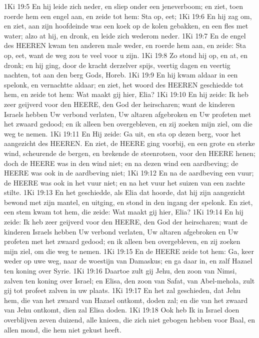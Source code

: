 1Ki 19:5  En hij leide zich neder, en sliep onder een jeneverboom; en ziet, toen roerde hem een engel aan, en zeide tot hem: Sta op, eet;
1Ki 19:6  En hij zag om, en ziet, aan zijn hoofdeinde was een koek op de kolen gebakken, en een fles met water; alzo at hij, en dronk, en leide zich wederom neder.
1Ki 19:7  En de engel des HEEREN kwam ten anderen male weder, en roerde hem aan, en zeide: Sta op, eet, want de weg zou te veel voor u zijn.
1Ki 19:8  Zo stond hij op, en at, en dronk; en hij ging, door de kracht derzelver spijs, veertig dagen en veertig nachten, tot aan den berg Gods, Horeb.
1Ki 19:9  En hij kwam aldaar in een spelonk, en vernachtte aldaar; en ziet, het woord des HEEREN geschiedde tot hem, en zeide tot hem: Wat maakt gij hier, Elia?
1Ki 19:10  En hij zeide: Ik heb zeer geijverd voor den HEERE, den God der heirscharen; want de kinderen Israels hebben Uw verbond verlaten, Uw altaren afgebroken en Uw profeten met het zwaard gedood; en ik alleen ben overgebleven, en zij zoeken mijn ziel, om die weg te nemen.
1Ki 19:11  En Hij zeide: Ga uit, en sta op dezen berg, voor het aangezicht des HEEREN. En ziet, de HEERE ging voorbij, en een grote en sterke wind, scheurende de bergen, en brekende de steenrotsen, voor den HEERE henen; doch de HEERE was in den wind niet; en na dezen wind een aardbeving; de HEERE was ook in de aardbeving niet;
1Ki 19:12  En na de aardbeving een vuur; de HEERE was ook in het vuur niet; en na het vuur het suizen van een zachte stilte.
1Ki 19:13  En het geschiedde, als Elia dat hoorde, dat hij zijn aangezicht bewond met zijn mantel, en uitging, en stond in den ingang der spelonk. En ziet, een stem kwam tot hem, die zeide: Wat maakt gij hier, Elia?
1Ki 19:14  En hij zeide: Ik heb zeer geijverd voor den HEERE, den God der heirscharen; want de kinderen Israels hebben Uw verbond verlaten, Uw altaren afgebroken en Uw profeten met het zwaard gedood; en ik alleen ben overgebleven, en zij zoeken mijn ziel, om die weg te nemen.
1Ki 19:15  En de HEERE zeide tot hem: Ga, keer weder op uwe weg, naar de woestijn van Damaskus; en ga daar in, en zalf Hazael ten koning over Syrie.
1Ki 19:16  Daartoe zult gij Jehu, den zoon van Nimsi, zalven ten koning over Israel; en Elisa, den zoon van Safat, van Abel-mehola, zult gij tot profeet zalven in uw plaats.
1Ki 19:17  En het zal geschieden, dat Jehu hem, die van het zwaard van Hazael ontkomt, doden zal; en die van het zwaard van Jehu ontkomt, dien zal Elisa doden.
1Ki 19:18  Ook heb Ik in Israel doen overblijven zeven duizend, alle knieen, die zich niet gebogen hebben voor Baal, en allen mond, die hem niet gekust heeft.
